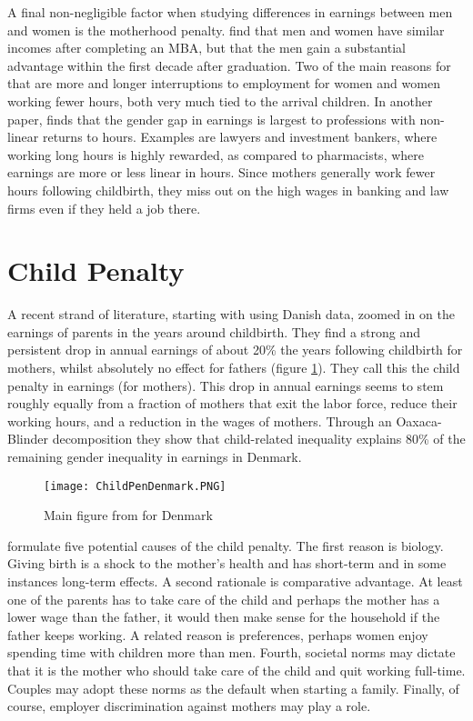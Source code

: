 \documentclass[10pt]{article}
\begin{document}
A final non-negligible factor when studying differences in earnings between men and women is the motherhood penalty. \cite{bertrand2010dynamics} find that men and women have similar incomes after completing an MBA, but that the men gain a substantial advantage within the first decade after graduation. Two of the main reasons for that are more and longer interruptions to employment for women and women working fewer hours, both very much tied to the arrival children. In another paper, \cite{goldin2016most} finds that the gender gap in earnings is largest to professions with non-linear returns to hours. Examples are lawyers and investment bankers, where working long hours is highly rewarded, as compared to pharmacists, where earnings are more or less linear in hours. Since mothers generally work fewer hours following childbirth, they miss out on the high wages in banking and law firms even if they held a job there.

\section{Child Penalty}
A recent strand of literature, starting with \cite{kleven2019children} using Danish data, zoomed in on  the earnings of parents in the years around childbirth. They find a strong and persistent drop in annual earnings of about 20\% the years following childbirth for mothers, whilst absolutely no effect for fathers (figure \ref{fig:cpden}). They call this the child penalty in earnings (for mothers). This drop in annual earnings seems to stem roughly equally from a fraction of mothers that exit the labor force, reduce their working hours, and a reduction in the wages of mothers. Through an Oaxaca-Blinder decomposition they show that child-related inequality explains 80\% of the remaining gender inequality in earnings in Denmark.

\begin{figure}
    \centering
    \texttt{[image: ChildPenDenmark.PNG]}
    \caption{Main figure from \cite{kleven2019children} for Denmark}
    \label{fig:cpden}
\end{figure}

\cite{andresen2022causes} formulate five potential causes of the child penalty. The first reason is biology. Giving birth is a shock to the mother's health and has short-term and in some instances long-term effects. A second rationale is comparative advantage. At least one of the parents has to take care of the child and perhaps the mother has a lower wage than the father, it would then make sense for the household if the father keeps working. A related reason is preferences, perhaps women enjoy spending time with children more than men. Fourth, societal norms may dictate that it is the mother who should take care of the child and quit working full-time. Couples may adopt these norms as the default when starting a family. Finally, of course, employer discrimination against mothers may play a role.
\end{document}
